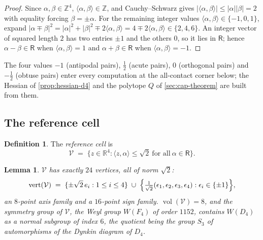 \documentclass[11pt,reqno]{amsart}
\renewcommand{\_}{\origunderscore\allowbreak}
\numberwithin{equation}{section}
\theoremstyle{plain}
\newtheorem{lem}[thm]{Lemma}
\theoremstyle{definition}
\newtheorem{definition}[thm]{Definition}
\theoremstyle{remark}
\newcommand{\Rt}{\mathsf{R}}                 %
\newcommand{\VCell}{\mathcal{V}}             %
\DeclareMathOperator{\vol}{vol}
\begin{document}
\begin{proof}
Since $\alpha,\beta\in\mathbb{Z}^4$, $\langle\alpha,\beta\rangle\in\mathbb{Z}$,
and Cauchy--Schwarz gives $|\langle\alpha,\beta\rangle|\le|\alpha||\beta|=2$
with equality forcing $\beta=\pm\alpha$. For the remaining integer values
$\langle\alpha,\beta\rangle\in\{-1,0,1\}$, expand
$|\alpha\mp\beta|^2=|\alpha|^2+|\beta|^2\mp2\langle\alpha,\beta\rangle
=4\mp2\langle\alpha,\beta\rangle\in\{2,4,6\}$. An integer vector of squared
length $2$ has two entries $\pm1$ and the others $0$, so it lies in $\Rt$;
hence $\alpha-\beta\in\Rt$ when $\langle\alpha,\beta\rangle=1$ and
$\alpha+\beta\in\Rt$ when $\langle\alpha,\beta\rangle=-1$.
\end{proof}

The four values $-1$ (antipodal pairs), $\tfrac12$ (acute pairs), $0$
(orthogonal pairs) and $-\tfrac12$ (obtuse pairs) enter every computation
at the all-contact corner below; the Hessian of \cref{prop:hessian-d4} and
the polytope $Q$ of \cref{sec:cap-theorem} are built from them.

\subsection{The reference cell}

\begin{definition}\label{def:refcell-new}
The \emph{reference cell} is
\[
  \VCell \;=\; \bigl\{z\in\mathbb{R}^4 : \langle z,\alpha\rangle\le\sqrt2
  \ \text{for all}\ \alpha\in\Rt\bigr\}.
\]
\end{definition}

\begin{lem}\label{lem:refcell-vol}
$\VCell$ has exactly $24$ vertices, all of norm $\sqrt2$:
\[
  \mathrm{vert}(\VCell) \;=\;
  \{\pm\sqrt2\,e_i : 1\le i\le4\} \;\cup\;
  \Bigl\{\tfrac{1}{\sqrt2}(\epsilon_1,\epsilon_2,\epsilon_3,\epsilon_4) :
  \epsilon_i\in\{\pm1\}\Bigr\},
\]
an $8$-point axis family and a $16$-point sign family. $\vol(\VCell)=8$,
and the symmetry group of $\VCell$, the Weyl group $W(F_4)$ of order
$1152$, contains $W(D_4)$ as a normal subgroup of index $6$, the quotient
being the group $S_3$ of automorphisms of the Dynkin diagram of $D_4$.
\end{lem}
\end{document}

